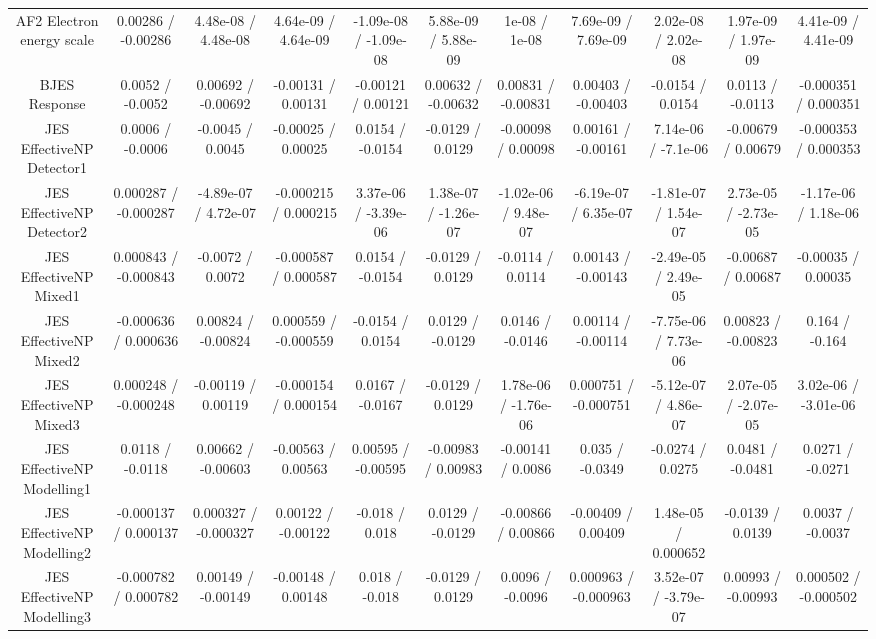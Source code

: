 \begin{table}[htbp]
\begin{center}
\begin{tabular}{|c|c|c|c|c|c|c|c|c|c|c|}
  AF2 Electron energy scale & 0.00286 / -0.00286 & 4.48e-08 / 4.48e-08 & 4.64e-09 / 4.64e-09 & -1.09e-08 / -1.09e-08 & 5.88e-09 / 5.88e-09 & 1e-08 / 1e-08 & 7.69e-09 / 7.69e-09 & 2.02e-08 / 2.02e-08 & 1.97e-09 / 1.97e-09 & 4.41e-09 / 4.41e-09 \\ 
  BJES Response & 0.0052 / -0.0052 & 0.00692 / -0.00692 & -0.00131 / 0.00131 & -0.00121 / 0.00121 & 0.00632 / -0.00632 & 0.00831 / -0.00831 & 0.00403 / -0.00403 & -0.0154 / 0.0154 & 0.0113 / -0.0113 & -0.000351 / 0.000351 \\ 
  JES EffectiveNP Detector1 & 0.0006 / -0.0006 & -0.0045 / 0.0045 & -0.00025 / 0.00025 & 0.0154 / -0.0154 & -0.0129 / 0.0129 & -0.00098 / 0.00098 & 0.00161 / -0.00161 & 7.14e-06 / -7.1e-06 & -0.00679 / 0.00679 & -0.000353 / 0.000353 \\ 
  JES EffectiveNP Detector2 & 0.000287 / -0.000287 & -4.89e-07 / 4.72e-07 & -0.000215 / 0.000215 & 3.37e-06 / -3.39e-06 & 1.38e-07 / -1.26e-07 & -1.02e-06 / 9.48e-07 & -6.19e-07 / 6.35e-07 & -1.81e-07 / 1.54e-07 & 2.73e-05 / -2.73e-05 & -1.17e-06 / 1.18e-06 \\ 
  JES EffectiveNP Mixed1 & 0.000843 / -0.000843 & -0.0072 / 0.0072 & -0.000587 / 0.000587 & 0.0154 / -0.0154 & -0.0129 / 0.0129 & -0.0114 / 0.0114 & 0.00143 / -0.00143 & -2.49e-05 / 2.49e-05 & -0.00687 / 0.00687 & -0.00035 / 0.00035 \\ 
  JES EffectiveNP Mixed2 & -0.000636 / 0.000636 & 0.00824 / -0.00824 & 0.000559 / -0.000559 & -0.0154 / 0.0154 & 0.0129 / -0.0129 & 0.0146 / -0.0146 & 0.00114 / -0.00114 & -7.75e-06 / 7.73e-06 & 0.00823 / -0.00823 & 0.164 / -0.164 \\ 
  JES EffectiveNP Mixed3 & 0.000248 / -0.000248 & -0.00119 / 0.00119 & -0.000154 / 0.000154 & 0.0167 / -0.0167 & -0.0129 / 0.0129 & 1.78e-06 / -1.76e-06 & 0.000751 / -0.000751 & -5.12e-07 / 4.86e-07 & 2.07e-05 / -2.07e-05 & 3.02e-06 / -3.01e-06 \\ 
  JES EffectiveNP Modelling1 & 0.0118 / -0.0118 & 0.00662 / -0.00603 & -0.00563 / 0.00563 & 0.00595 / -0.00595 & -0.00983 / 0.00983 & -0.00141 / 0.0086 & 0.035 / -0.0349 & -0.0274 / 0.0275 & 0.0481 / -0.0481 & 0.0271 / -0.0271 \\ 
  JES EffectiveNP Modelling2 & -0.000137 / 0.000137 & 0.000327 / -0.000327 & 0.00122 / -0.00122 & -0.018 / 0.018 & 0.0129 / -0.0129 & -0.00866 / 0.00866 & -0.00409 / 0.00409 & 1.48e-05 / 0.000652 & -0.0139 / 0.0139 & 0.0037 / -0.0037 \\ 
  JES EffectiveNP Modelling3 & -0.000782 / 0.000782 & 0.00149 / -0.00149 & -0.00148 / 0.00148 & 0.018 / -0.018 & -0.0129 / 0.0129 & 0.0096 / -0.0096 & 0.000963 / -0.000963 & 3.52e-07 / -3.79e-07 & 0.00993 / -0.00993 & 0.000502 / -0.000502 \\ 

\end{tabular}
\end{center}
\end{table}
